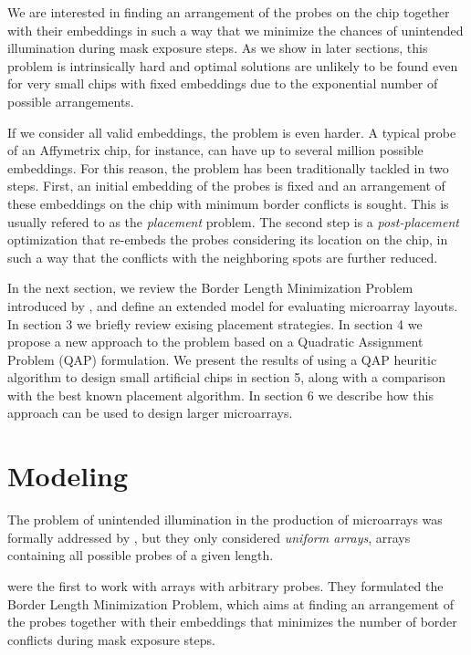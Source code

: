 \documentclass{bioinfo}
\begin{document}
We are interested in finding an arrangement of the probes on the chip together with their embeddings in such a way that we minimize the chances of unintended illumination during mask exposure steps. As we show in later sections, this problem is intrinsically hard and optimal solutions are unlikely to be found even for very small chips with fixed embeddings due to the exponential number of possible arrangements.

If we consider all valid embeddings, the problem is even harder. A typical probe of an Affymetrix chip, for instance, can have up to several million possible embeddings. For this reason, the problem has been traditionally tackled in two steps. First, an initial embedding of the probes is fixed and an arrangement of these embeddings on the chip with minimum border conflicts is sought. This is usually refered to as the \emph{placement} problem. The second step is a \emph{post-placement} optimization that re-embeds the probes considering its location on the chip, in such a way that the conflicts with the neighboring spots are further reduced.

In the next section, we review the Border Length Minimization Problem introduced by \citealp{HANNENHALLI02}, and define an extended model for evaluating microarray layouts. In section 3 we briefly review exising placement strategies. In section 4 we propose a new approach to the problem based on a Quadratic Assignment Problem (QAP) formulation. We present the results of using a QAP heuritic algorithm to design small artificial chips in section 5, along with a comparison with the best known placement algorithm. In section 6 we describe how this approach can be used to design larger microarrays.

\section{Modeling}

The problem of unintended illumination in the production of microarrays was formally addressed by \citealp{FELDMAN93}, but they only considered \emph{uniform arrays}, arrays containing all possible probes of a given length.

\citealp{HANNENHALLI02} were the first to work with arrays with arbitrary probes. They formulated the Border Length Minimization Problem, which aims at finding an arrangement of the probes together with their embeddings that minimizes the number of border conflicts during mask exposure steps.
\end{document}
